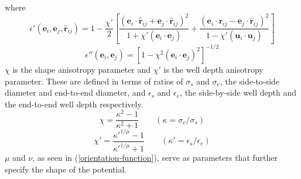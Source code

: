 \documentclass[preprint, aps]{revtex4-1}
\begin{document}
where
	\begin{equation} \label{o-func1}
		\epsilon'(\mathbf{e}_i,\mathbf{e}_j,\mathbf{\hat{r}}_{ij}) 
		= 1 - \frac{\chi'}{2}
		\left[
			\frac{
				(\mathbf{e}_i \cdot \mathbf{\hat{r}}_{ij} 
				+ \mathbf{e}_j \cdot \mathbf{\hat{r}}_{ij})^2
			}
			{
				1+\chi'(\mathbf{e}_i \cdot \mathbf{e}_j)
			}
			+ \frac{
				(\mathbf{e}_i \cdot \mathbf{\hat{r}}_{ij} 
				- \mathbf{e}_j \cdot \mathbf{\hat{r}}_{ij})^2
				}
				{
					1-\chi'(\mathbf{u}_i \cdot \mathbf{u}_j)
				}
		\right]
	\end{equation}
	\begin{equation} \label{o-func2}	
		\epsilon''(\mathbf{e}_i,\mathbf{e}_j) 
		= \left[ 1 - \chi^2(\mathbf{e}_i \cdot \mathbf{e}_j)^2 \right]^{-1/2}	
	\end{equation}
$\chi$ is the shape anisotropy parameter and $\chi'$ is the well depth 
anisotropy parameter. These are defined in terms of ratios of $\sigma_s$ 
and $\sigma_e$, the side-to-side diameter and end-to-end diameter, and 
$\epsilon_s$ and $\epsilon_e$, the side-by-side well depth and the 
end-to-end well depth respectively.
	\begin{equation} \label{chi}
		\chi = \frac{\kappa^2 - 1}{\kappa^2 + 1} 
		\qquad (\kappa = \sigma_e / \sigma_s)
	\end{equation}
	\begin{equation} \label{chi-prime}	
		\chi' = \frac{\kappa'^{1/\mu} - 1}{\kappa'^{1/\mu} + 1} 
		\qquad (\kappa' = \epsilon_s / \epsilon_e)
	\end{equation}
$\mu$ and $\nu$, as seen in (\ref{orientation-function}), serve as parameters 
that further specify the shape of the potential. 
\end{document}
